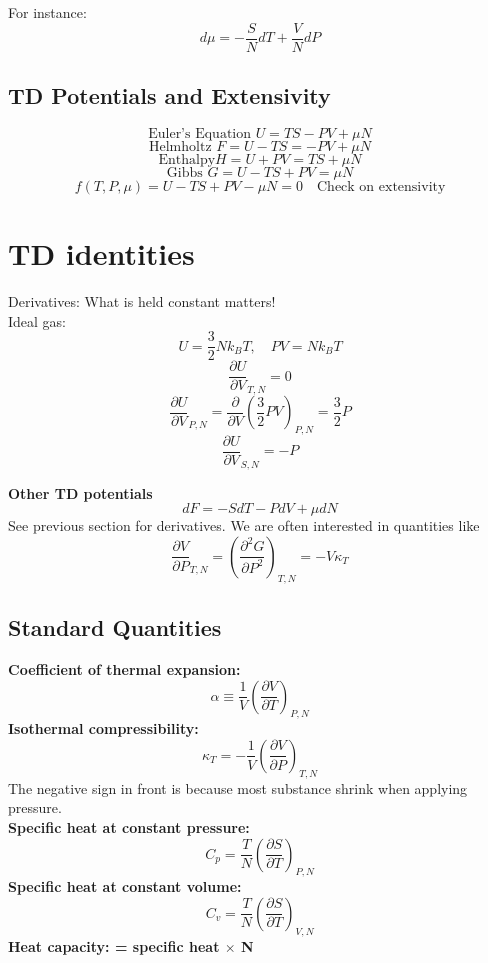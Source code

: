 \documentclass[11pt]{article}
\theoremstyle{definition}
\begin{document}
For instance:
\[ d\mu = -\frac{S}{N}dT + \frac{V}{N}dP\] 

\subsection{TD Potentials and Extensivity}
\[ \text{Euler's Equation } U = TS - PV + \mu N  \]
\[ \text{Helmholtz } F = U -TS = -PV+\mu N \] 
\[ \text{Enthalpy} H = U+PV = TS + \mu N \] 
\[ \text{Gibbs } G = U-TS +PV = \mu N \] 
\[ f(T,P,\mu) = U-TS+PV-\mu N  = 0 \quad \text{Check on extensivity} \] 


\section{TD identities}
Derivatives: What is held constant matters! \\
Ideal gas:
\[ U = \frac{3}{2}Nk_BT, \quad PV=Nk_BT \] 
\[ \frac{\partial U}{\partial V}_{T,N} = 0 \] 
\[ \frac{\partial U}{\partial V}_{P,N} = \frac{\partial }{\partial V}(\frac{3}{2}PV)_{P,N} = \frac{3}{2}P \] 
\[ \frac{\partial U}{\partial V}_{S,N} = -P \] 

\textbf{Other TD potentials} 
\[ dF = -SdT - PdV + \mu dN \] 
See previous section for derivatives.
We are often interested in quantities like
\[ \frac{\partial V}{\partial P}_{T,N} = \left( \frac{\partial ^2 G}{\partial P^2} \right )_{T,N} = - V\kappa _T\] 
\subsection{Standard Quantities}
\textbf{Coefficient of thermal expansion:}
\begin{equation}
	\alpha \equiv \frac{1}{V}\left( \frac{\partial V}{\partial T} \right) _{P,N}
\end{equation}
\textbf{Isothermal compressibility:}
\begin{equation}
	\kappa _T = - \frac{1}{V}\left( \frac{\partial V}{\partial P} \right) _{T,N}
\end{equation}
The negative sign in front is because most substance shrink when applying pressure. \\
\textbf{Specific heat at constant pressure:} 
\begin{equation}
	C_p = \frac{T}{N} \left (\frac{\partial S}{\partial T} \right )_{P,N}
\end{equation}
\textbf{Specific heat at constant volume:} 
\begin{equation}
	C_v = \frac{T}{N}\left( \frac{\partial S}{\partial T} \right)_{V,N}
\end{equation}
\textbf{Heat capacity: = specific heat $ \times $ N}  
\end{document}
